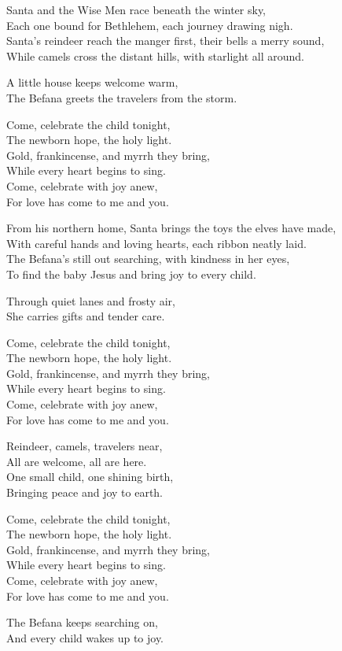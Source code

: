 \begin{lyrics}
Santa and the Wise Men race beneath the winter sky,\\
Each one bound for Bethlehem, each journey drawing nigh.\\
Santa’s reindeer reach the manger first, their bells a merry sound,\\
While camels cross the distant hills, with starlight all around.

A little house keeps welcome warm,\\
The Befana greets the travelers from the storm.

Come, celebrate the child tonight,\\
The newborn hope, the holy light.\\
Gold, frankincense, and myrrh they bring,\\
While every heart begins to sing.\\
Come, celebrate with joy anew,\\
For love has come to me and you.

From his northern home, Santa brings the toys the elves have made,\\
With careful hands and loving hearts, each ribbon neatly laid.\\
The Befana’s still out searching, with kindness in her eyes,\\
To find the baby Jesus and bring joy to every child.

Through quiet lanes and frosty air,\\
She carries gifts and tender care.

Come, celebrate the child tonight,\\
The newborn hope, the holy light.\\
Gold, frankincense, and myrrh they bring,\\
While every heart begins to sing.\\
Come, celebrate with joy anew,\\
For love has come to me and you.

Reindeer, camels, travelers near,\\
All are welcome, all are here.\\
One small child, one shining birth,\\
Bringing peace and joy to earth.

Come, celebrate the child tonight,\\
The newborn hope, the holy light.\\
Gold, frankincense, and myrrh they bring,\\
While every heart begins to sing.\\
Come, celebrate with joy anew,\\
For love has come to me and you.

The Befana keeps searching on,\\
And every child wakes up to joy.
\end{lyrics}

